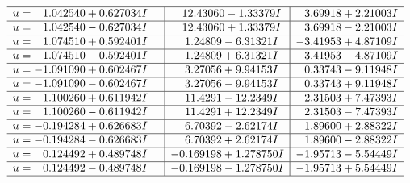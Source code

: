 \documentclass[1p]{elsarticle_modified}
\theoremstyle{definition}
\begin{document}
$$\begin{array}{c|c|c}
 \hline 
\begin{aligned}
u &= \phantom{-}1.042540 + 0.627034 I\end{aligned}
 & \phantom{-}12.43060 - 1.33379 I & \phantom{-}3.69918 + 2.21003 I \\ \hline\begin{aligned}
u &= \phantom{-}1.042540 - 0.627034 I\end{aligned}
 & \phantom{-}12.43060 + 1.33379 I & \phantom{-}3.69918 - 2.21003 I \\ \hline\begin{aligned}
u &= \phantom{-}1.074510 + 0.592401 I\end{aligned}
 & \phantom{-}1.24809 - 6.31321 I & -3.41953 + 4.87109 I \\ \hline\begin{aligned}
u &= \phantom{-}1.074510 - 0.592401 I\end{aligned}
 & \phantom{-}1.24809 + 6.31321 I & -3.41953 - 4.87109 I \\ \hline\begin{aligned}
u &= -1.091090 + 0.602467 I\end{aligned}
 & \phantom{-}3.27056 + 9.94153 I & \phantom{-}0.33743 - 9.11948 I \\ \hline\begin{aligned}
u &= -1.091090 - 0.602467 I\end{aligned}
 & \phantom{-}3.27056 - 9.94153 I & \phantom{-}0.33743 + 9.11948 I \\ \hline\begin{aligned}
u &= \phantom{-}1.100260 + 0.611942 I\end{aligned}
 & \phantom{-}11.4291 - 12.2349 I & \phantom{-}2.31503 + 7.47393 I \\ \hline\begin{aligned}
u &= \phantom{-}1.100260 - 0.611942 I\end{aligned}
 & \phantom{-}11.4291 + 12.2349 I & \phantom{-}2.31503 - 7.47393 I \\ \hline\begin{aligned}
u &= -0.194284 + 0.626683 I\end{aligned}
 & \phantom{-}6.70392 - 2.62174 I & \phantom{-}1.89600 + 2.88322 I \\ \hline\begin{aligned}
u &= -0.194284 - 0.626683 I\end{aligned}
 & \phantom{-}6.70392 + 2.62174 I & \phantom{-}1.89600 - 2.88322 I \\ \hline\begin{aligned}
u &= \phantom{-}0.124492 + 0.489748 I\end{aligned}
 & -0.169198 + 1.278750 I & -1.95713 - 5.54449 I \\ \hline\begin{aligned}
u &= \phantom{-}0.124492 - 0.489748 I\end{aligned}
 & -0.169198 - 1.278750 I & -1.95713 + 5.54449 I\\
 \hline 
 \end{array}$$\newpage
\end{document}
